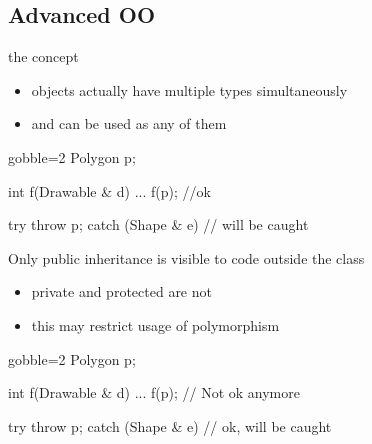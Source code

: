 \subsection[advOO]{Advanced OO}

\begin{frame}[fragile]
  \begin{block}{the concept}
    \begin{itemize}
    \item objects actually have multiple types simultaneously
    \item and can be used as any of them
    \end{itemize}
  \end{block}
  \begin{multicols}{2}
    \begin{cppcode*}{gobble=2}
      Polygon p;

      int f(Drawable & d) {...}
      f(p);  //ok

      try {
        throw p;
      } catch (Shape & e) {
        // will be caught
      }
    \end{cppcode*}
    \columnbreak
    \center
  \end{multicols}
\end{frame}


\begin{frame}[fragile]
  \begin{block}{Only public inheritance is visible to code outside the class}
    \begin{itemize}
    \item private and protected are not
    \item this may restrict usage of polymorphism
    \end{itemize}
  \end{block}
  \begin{multicols}{2}
    \begin{cppcode*}{gobble=2}
      Polygon p;

      int f(Drawable & d) {...}
      f(p);  // Not ok anymore

      try {
        throw p;
      } catch (Shape & e) {
        // ok, will be caught
      }
    \end{cppcode*}
    \columnbreak
    \center
  \end{multicols}
\end{frame}

